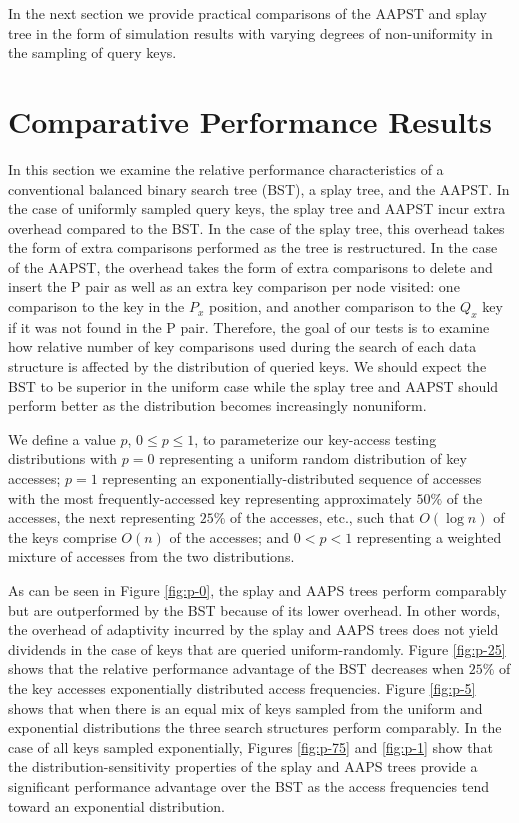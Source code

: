 \documentclass{article}
\begin{document}
In the next section we provide practical comparisons of the AAPST and splay tree in the form of simulation results with varying degrees of non-uniformity in the sampling of query keys.

\section{Comparative Performance Results}

In this section we examine the relative performance characteristics of a conventional balanced binary search tree (BST), a splay tree, and the AAPST. In the case of uniformly sampled query keys, the splay tree and AAPST incur extra overhead compared to the BST. In the case of the splay tree, this overhead takes the form of extra comparisons performed as the tree is restructured. In the case of the AAPST, the overhead takes the form of extra comparisons to delete and insert the P pair as well as an extra key comparison per node visited: one comparison to the key in the $P_x$ position, and another comparison to the $Q_x$ key if it was not found in the P pair. Therefore, the goal of our tests is to examine how relative number of key comparisons used during the search of each data structure is affected by the distribution of queried keys. We should expect the BST to be superior in the uniform case while the splay tree and AAPST should perform better as the distribution becomes increasingly nonuniform. 

We define a value $p$, $0\leq p\leq 1$, to parameterize our key-access testing distributions with $p=0$ representing a uniform random distribution of key accesses; $p=1$ representing an exponentially-distributed sequence of accesses with the most frequently-accessed key representing approximately $50\%$ of the accesses, the next representing $25\%$ of the accesses, etc., such that $O(\log n)$ of the keys comprise $O(n)$ of the accesses; and $0<p<1$ representing a weighted mixture of accesses from the two distributions. 
	
As can be seen in Figure \ref{fig:p-0}, the splay and AAPS trees perform comparably but are outperformed by the BST because of its lower overhead. In other words, the overhead of adaptivity incurred by the splay and AAPS trees does not yield dividends in the case of keys that are queried uniform-randomly. Figure \ref{fig:p-25} shows that the relative performance advantage of the BST decreases when $25\%$ of the key accesses exponentially distributed access frequencies. Figure \ref{fig:p-5} shows that when there is an equal mix of keys sampled from the uniform and exponential distributions the three search structures perform comparably. In the case of all keys sampled exponentially, Figures \ref{fig:p-75} and \ref{fig:p-1} show that the distribution-sensitivity properties of the splay and AAPS trees provide a significant performance advantage over the BST as the access frequencies tend toward an exponential distribution.
\end{document}
